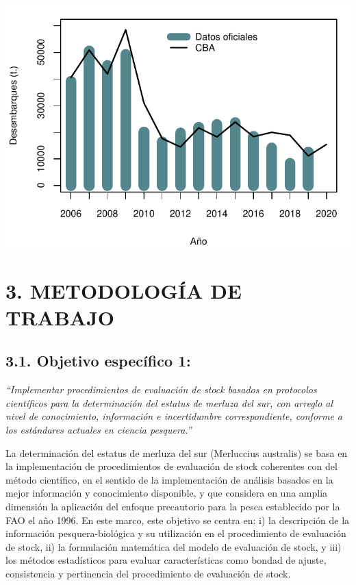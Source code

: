 \documentclass[
  spanish,
]{article}
\begin{document}
\begin{center}\includegraphics{Figuras/antecedentes_desembarques-1} \end{center}

\pagebreak

\hypertarget{metodologuxeda-de-trabajo}{%
\section{3. METODOLOGÍA DE TRABAJO}\label{metodologuxeda-de-trabajo}}

\hypertarget{objetivo-especuxedfico-1}{%
\subsection{3.1. Objetivo específico
1:}\label{objetivo-especuxedfico-1}}

\emph{``Implementar procedimientos de evaluación de stock basados en
protocolos científicos para la determinación del estatus de merluza del
sur, con arreglo al nivel de conocimiento, información e incertidumbre
correspondiente, conforme a los estándares actuales en ciencia
pesquera.''}

La determinación del estatus de merluza del sur (Merluccius australis)
se basa en la implementación de procedimientos de evaluación de stock
coherentes con del método científico, en el sentido de la implementación
de análisis basados en la mejor información y conocimiento disponible, y
que considera en una amplia dimensión la aplicación del enfoque
precautorio para la pesca establecido por la FAO el año 1996. En este
marco, este objetivo se centra en: i) la descripción de la información
pesquera-biológica y su utilización en el procedimiento de evaluación de
stock, ii) la formulación matemática del modelo de evaluación de stock,
y iii) los métodos estadísticos para evaluar características como bondad
de ajuste, consistencia y pertinencia del procedimiento de evaluación de
stock.
\end{document}
